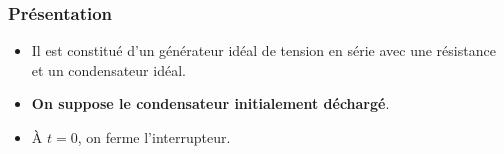 \documentclass[../../main/main.tex]{subfiles}
\begin{document}
\subsubsection{Présentation}
\noindent
\begin{minipage}[c]{.6\linewidth}
	\begin{itemize}
		\item Il est constitué d'un générateur idéal de tension en série avec une
		      résistance et un condensateur idéal.
		\item \textbf{On suppose le condensateur initialement déchargé}.
		\item À $t=0$, on ferme l'interrupteur.
	\end{itemize}
\end{minipage}
\hfill
\begin{minipage}[c]{.35\linewidth}
	~
	\begin{center}
		\label{fig:circ_rc-start}
	\end{center}
\end{minipage}
\end{document}
